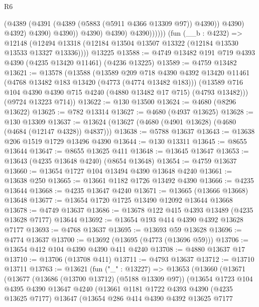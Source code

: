 \begin{lexlean}{R6}
\begin{coremodule}
                            (@4389 (@4391 (@4389 (@5883 (@5911 @4366 @13309 @97)) @4390)) @4390)
                            @4392)
                          @4390)
                        @4390))
                    @4390)
                  @4390)
                @4390))))))
    (fun (__b : @4232) =>
    @12148 (@12494 @13318 (@12184 @13504 @13507 @13322 (@12184 @13530 @13533 @13327 @13336))))
    @13225
@13588 := @4749 @13482 @191 @719 @4393 @4390 (@4235 @13420 @11461) (@4236 @13225)
@13589 := @4759 @13482
@13621 := @13578
    (@13588
      (@13589
        @209
        @718
        @4390
        @4392
        @13420
        @11461
        (@4768 @13482 @183 @13420 (@4773 (@4774 @13482 @183)))
        (@13589 @716 @104 @4390 @4390 @715 @4240 (@4880 @13482 @17 @715) (@4793 @13482)))
      (@9724 @13223 @714))
@13622 := @130 @13500
@13624 := @4680 (@8296 @13622)
@13625 := @782 @13314
@13627 := @4680 (@4937 @13625)
@13628 := @130 @13309
@13637 := @13624 (@13627 (@4680 (@4901 @13628) (@4680 (@4684 (@12147 @4328)) @4837)))
@13638 := @5788 @13637
@13643 := @13638 @206 @1519 @1729 @13496 @4390
@13644 := @130 @13311
@13645 := @8655 @13644
@13647 := @8655 @13625 @411
@13648 := @13645 @13647
@13653 := @13643 (@4235 @13648 @4240) (@8654 @13648)
@13654 := @4759 @13637
@13660 := @13654 @1727 @104 @13494 @4390 @13648 @4240
@13661 := @13638 @250
@13665 := @13661 @1182 @1726 @13492 @4390
@13666 := @4235 @13644
@13668 := @4235 @13647 @4240
@13671 := @13665 (@13666 @13668) @13648
@13677 := @13654 @1720 @1725 @13490 @12092 @13644 @13668
@13678 := @4749 @13637
@13686 := @13678 @122 @415 @4393 @13489 (@4235 @13628 @7177) @13644
@13692 := @13654 @193 @414 @4390 @4392 @13628 @7177
@13693 := @4768 @13637
@13695 := @13693 @59 @13628
@13696 := @4774 @13637
@13700 := @13692 (@13695 (@4773 (@13696 @59)))
@13706 := @13654 @412 @104 @4390 @4390 @411 @4240
@13708 := @4880 @13637 @17
@13710 := @13706 (@13708 @411)
@13711 := @4793 @13637
@13712 := @13710 @13711
@13763 := @13621
    (fun ("_" : @13227) =>
    @13653
      (@13660
        (@13671
          (@13677
            (@13686 (@13700 @13712) (@5188 @13309 @97))
            (@13654
              @1723
              @104
              @4395
              @4390
              @13647
              @4240
              (@13661
                @1181
                @1722
                @4393
                @4390
                (@4235 @13625 @7177)
                @13647
                (@13654
                  @286
                  @414
                  @4390
                  @4392
                  @13625
                  @7177

\end{coremodule}
\end{lexlean}
